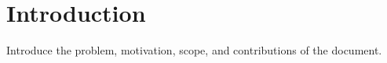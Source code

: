 \section{Introduction}
\label{sec:introduction}

Introduce the problem, motivation, scope, and contributions of the document.
